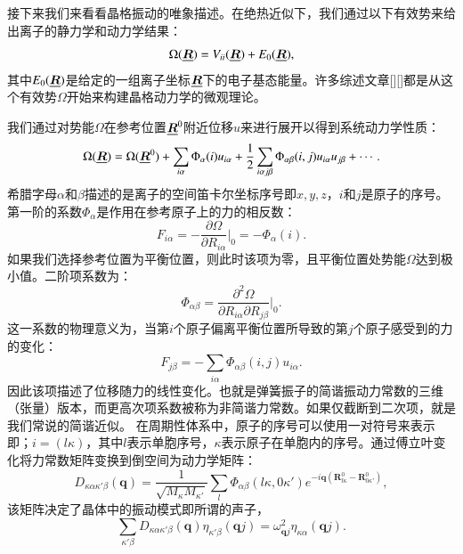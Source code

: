 \documentclass[phd,nobackinfo]{scutthesis}
\begin{document}
接下来我们来看看晶格振动的唯象描述。在绝热近似下，我们通过以下有效势来给出离子的静力学和动力学结果：
\begin{equation}\label{eq:effective_potential}
  \Omega(\underline{\bm{R}}) = V_{ii}(\underline{\bm{R}}) + E_0(\underline{\bm{R}}),
\end{equation}
其中$E_0(\underline{\bm{R}})$是给定的一组离子坐标$\underline{\bm{R}}$下的电子基态能量。许多综述文章[][]都是从这个有效势$\Omega$开始来构建晶格动力学的微观理论。

我们通过对势能$\Omega$在参考位置$\underline{\bm{R}}^0$附近位移$u$来进行展开以得到系统动力学性质：
\begin{equation}
  \Omega(\underline{\bm{R}}) = \Omega(\underline{\bm{R}}^0) + \sum_{i\alpha} \Phi_\alpha(i)u_{i\alpha} + \frac{1}{2} \sum_{i\alpha j\beta} \Phi_{\alpha\beta}(i,j) u_{i\alpha}u_{j\beta} + \cdots .
\end{equation}
希腊字母$\alpha$和$\beta$描述的是离子的空间笛卡尔坐标序号即$x,y,z$，$i$和$j$是原子的序号。第一阶的系数$\Phi_\alpha$是作用在参考原子上的力的相反数：
\begin{equation}
  F_{i\alpha} = -\frac{\partial\Omega}{\partial R_{i\alpha}}\bigg|_0 = -\Phi_\alpha(i).
\end{equation}
如果我们选择参考位置为平衡位置，则此时该项为零，且平衡位置处势能$\Omega$达到极小值。二阶项系数为：
\begin{equation}
  \Phi_{\alpha\beta} = \frac{\partial^2\Omega}{\partial R_{i\alpha}\partial R_{j\beta}} \bigg|_0 .
\end{equation}
这一系数的物理意义为，当第$i$个原子偏离平衡位置所导致的第$j$个原子感受到的力的变化：
\begin{equation}
  F_{j\beta} = -\sum_{i\alpha} \Phi_{\alpha\beta}(i,j)u_{i\alpha}.
\end{equation}
因此该项描述了位移随力的线性变化。也就是弹簧振子的简谐振动力常数的三维（张量）版本，而更高次项系数被称为非简谐力常数。如果仅截断到二次项，就是我们常说的简谐近似。
在周期性体系中，原子的序号可以使用一对符号来表示即；$i=(l\kappa)$，其中$l$表示单胞序号，$\kappa$表示原子在单胞内的序号。通过傅立叶变化将力常数矩阵变换到倒空间为动力学矩阵：
\begin{equation}
  D_{\kappa\alpha\kappa'\beta}(\bm{q}) = \frac{1}{\sqrt{M_\kappa M_{\kappa'}}} \sum_l \Phi_{\alpha\beta}(l\kappa,0\kappa')e^{-i\bm{q}(\bm{R}^0_{l\kappa}-\bm{R}^0_{0\kappa'})},
\end{equation}
该矩阵决定了晶体中的振动模式即所谓的声子，
\begin{equation}
  \sum_{\kappa'\beta}D_{\kappa\alpha\kappa'\beta}(\bm{q})\eta_{\kappa'\beta}(\bm{q}j) = \omega^2_{\bm{q}j}\eta_{\kappa\alpha}(\bm{q}j).
\end{equation}
\end{document}

